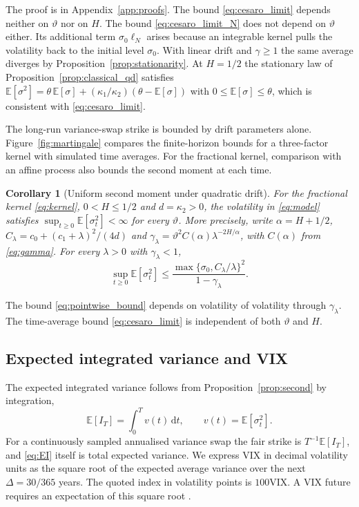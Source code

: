 \documentclass{rQUF2e}
\theoremstyle{plain}
\newtheorem{corollary}[theorem]{Corollary}
\theoremstyle{definition}
\theoremstyle{remark}
\newcommand{\D}{\mathrm{d}}
\newcommand{\E}{\mathbb{E}}
\newcommand{\VIX}{\mathrm{VIX}}
\begin{document}
The proof is in Appendix~\ref{app:proofs}. The bound \eqref{eq:cesaro_limit} depends neither on $\vartheta$ nor on $H$. The bound \eqref{eq:cesaro_limit_N} does not depend on $\vartheta$ either. Its additional term $\sigma_0\ell_N$ arises because an integrable kernel pulls the volatility back to the initial level $\sigma_0$. With linear drift and $\gamma\ge1$ the same average diverges by Proposition~\ref{prop:stationarity}. At $H=1/2$ the stationary law of Proposition~\ref{prop:classical_qd} satisfies $\E[\sigma^2]=\theta\,\E[\sigma]+(\kappa_1/\kappa_2)(\theta-\E[\sigma])$ with $0\le\E[\sigma]\le\theta$, which is consistent with \eqref{eq:cesaro_limit}.

The long-run variance-swap strike is bounded by drift parameters alone. Figure~\ref{fig:martingale} compares the finite-horizon bounds for a three-factor kernel with simulated time averages. For the fractional kernel, comparison with an affine process also bounds the second moment at each time.

\begin{corollary}[Uniform second moment under quadratic drift]\label{cor:pointwise}
For the fractional kernel \eqref{eq:kernel}, $0<H\le1/2$ and $d=\kappa_2>0$, the volatility in \eqref{eq:model} satisfies $\sup_{t\ge0}\E[\sigma_t^2]<\infty$ for every $\vartheta$. More precisely, write $\alpha=H+1/2$, $C_\lambda=c_0+(c_1+\lambda)^2/(4d)$ and $\gamma_\lambda=\vartheta^2 C(\alpha)\lambda^{-2H/\alpha}$, with $C(\alpha)$ from \eqref{eq:gamma}. For every $\lambda>0$ with $\gamma_\lambda<1$,
\begin{equation}\label{eq:pointwise_bound}
\sup_{t\ge0}\E[\sigma_t^2]\le\frac{\max\{\sigma_0,C_\lambda/\lambda\}^2}{1-\gamma_\lambda}.
\end{equation}
\end{corollary}
The bound \eqref{eq:pointwise_bound} depends on volatility of volatility through $\gamma_\lambda$. The time-average bound \eqref{eq:cesaro_limit} is independent of both $\vartheta$ and $H$.

\subsection{Expected integrated variance and VIX}

The expected integrated variance follows from Proposition~\ref{prop:second} by integration,
\begin{equation}\label{eq:EI}
\E[I_T]=\int_0^T v(t)\,\D t,\qquad v(t)=\E[\sigma_t^2] .
\end{equation}
For a continuously sampled annualised variance swap the fair strike is $T^{-1}\E[I_T]$, and \eqref{eq:EI} itself is total expected variance. We express VIX in decimal volatility units as the square root of the expected average variance over the next $\Delta=30/365$ years. The quoted index in volatility points is $100\VIX$. A VIX future requires an expectation of this square root \citep{Sepp2008}.
\end{document}
